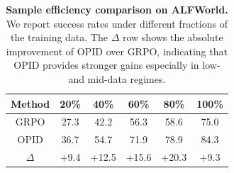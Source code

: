 \begin{table}[htbp]
\centering
\caption{\textbf{Sample efficiency comparison on ALFWorld.} We report success rates under different fractions of the training data. The $\Delta$ row shows the absolute improvement of OPID over GRPO, indicating that OPID provides stronger gains especially in low- and mid-data regimes.}
\vspace{0.05in}
\label{tab:sample_efficiency}
\setlength{\tabcolsep}{8pt}
\renewcommand{\arraystretch}{1.08}
\begin{tabular}{cccccc}
\toprule
\textbf{Method} & \textbf{20\%} & \textbf{40\%} & \textbf{60\%} & \textbf{80\%} & \textbf{100\%} \\
\midrule
GRPO & 27.3 & 42.2 & 56.3 & 58.6 & 75.0 \\
\rowcolor{gray!10}
OPID & 36.7 & 54.7 & 71.9 & 78.9 & 84.3 \\
\rowcolor{blue!6}
$\Delta$ & +9.4 & +12.5 & +15.6 & +20.3 & +9.3 \\
\bottomrule
\end{tabular}
\end{table}


